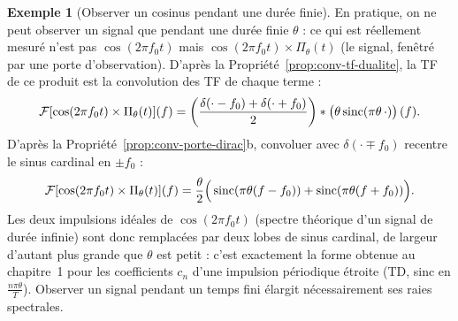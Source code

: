 \documentclass[a4paper,11pt]{article}
\theoremstyle{definition}
\newtheorem{exemple}{Exemple}[section]
\begin{document}
\begin{exemple}[Observer un cosinus pendant une durée finie]
    En pratique, on ne peut observer un signal que pendant une durée finie $\theta$ : ce qui est réellement mesuré n'est pas $\cos(2\pi f_0t)$ mais $\cos(2\pi f_0t)\times\Pi_\theta(t)$ (le signal, fenêtré par une porte d'observation). D'après la Propriété~\ref{prop:conv-tf-dualite}, la TF de ce produit est la convolution des TF de chaque terme :
    $$
        \mathcal F[\cos(2\pi f_0t)\times\Pi_\theta(t)](f) = \left(\frac{\delta(\cdot-f_0)+\delta(\cdot+f_0)}{2}\right)*\big(\theta\operatorname{sinc}(\pi\theta\,\cdot)\big)\,(f).
    $$
    D'après la Propriété~\ref{prop:conv-porte-dirac}b, convoluer avec $\delta(\cdot\mp f_0)$ recentre le sinus cardinal en $\pm f_0$ :
    $$
        \mathcal F[\cos(2\pi f_0t)\times\Pi_\theta(t)](f) = \frac\theta2\Big(\operatorname{sinc}(\pi\theta(f-f_0)) + \operatorname{sinc}(\pi\theta(f+f_0))\Big).
    $$
    Les deux impulsions idéales de $\cos(2\pi f_0t)$ (spectre théorique d'un signal de durée infinie) sont donc remplacées par deux lobes de sinus cardinal, de largeur d'autant plus grande que $\theta$ est petit : c'est exactement la forme obtenue au chapitre~1 pour les coefficients $c_n$ d'une impulsion périodique étroite (TD, sinc en $\frac{n\pi\theta}{T}$). Observer un signal pendant un temps fini élargit nécessairement ses raies spectrales.


\end{exemple}
\end{document}

